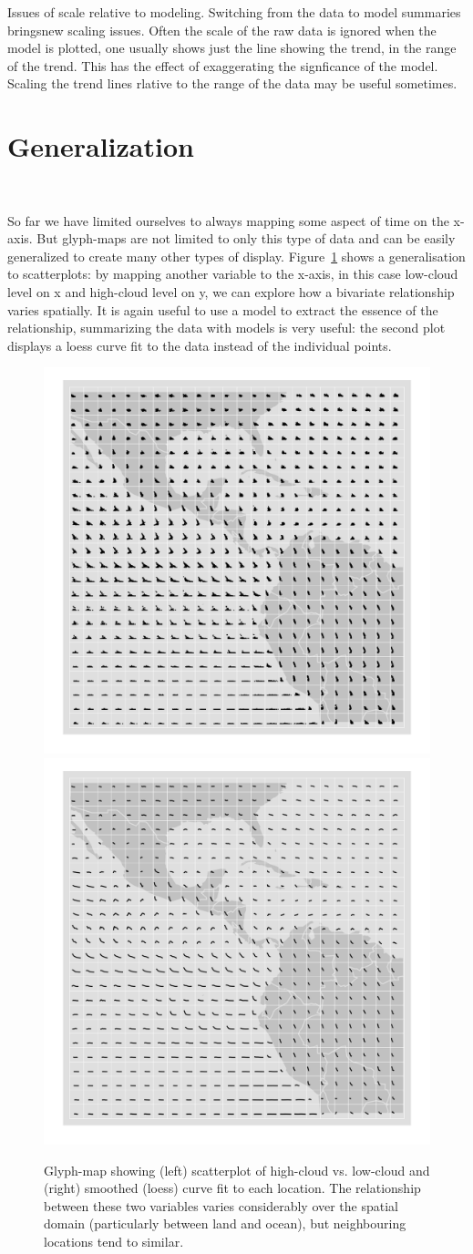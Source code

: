 \documentclass[oneside]{article}
\begin{document}
Issues of scale relative to modeling. Switching from the data to model summaries bringsnew scaling issues. Often the scale of the raw data is ignored when the model is plotted, one usually shows just the line showing the trend, in the range of the trend. This has the effect of exaggerating the signficance of the model. Scaling the trend lines rlative to the range of the data may be useful sometimes.

\section{Generalization}~\label{sec:scatter}

So far we have limited ourselves to always mapping some aspect of time on the x-axis. But glyph-maps are not limited to only this type of data and can  be easily generalized to create many other types of display. Figure~\ref{fig:cloud} shows a generalisation to scatterplots: by mapping another variable to the x-axis, in this case low-cloud level on x and high-cloud level on y, we can explore how a bivariate relationship varies spatially. It is again useful to use a model to extract the essence of the relationship, summarizing the data with models is very useful: the second plot displays a loess curve fit to the data instead of the individual points.  

\begin{figure}[htbp]
  \centering
  \includegraphics[width=0.5\linewidth]{clouds}%
  \includegraphics[width=0.5\linewidth]{clouds-smooth}

  \caption{Glyph-map showing (left) scatterplot of high-cloud vs. low-cloud and (right) smoothed (loess) curve fit to each location. The relationship between these two variables varies considerably over the spatial domain (particularly between land and ocean), but neighbouring locations tend to similar. }
  \label{fig:cloud}
\end{figure}
\end{document}
